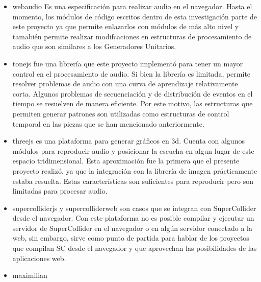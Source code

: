 \begin{itemize}
  
\item \Gls{webaudio} Es una especificación para realizar audio en el navegador. Hasta el momento, los módulos de código escritos dentro de esta investigación parte de este proyecto ya que permite enlazarlos con módulos de más alto nivel y tamabién permite realizar modifcaciones en estructuras de procesamiento de audio que son similares a los Generadores Unitarios.
\item \Gls{tonejs} fue una librería que este proyecto implementó para tener un mayor control en el procesamiento de audio. Si bien la librería es limitada, permite resolver problemas de audio con una curva de aprendizaje relativamente corta. Algunos problemas de secuenciación y de distribución de eventos en el tiempo se resuelven de manera eficiente. Por este motivo, las estructuras que permiten generar patrones son utilizadas como estructuras de control temporal en las piezas que se han mencionado anteriormente.
\item \Gls{threejs} es una plataforma para generar gráficos en 3d. Cuenta con algunos módulos para reproducir audio y posicionar la escucha en algun lugar de este espacio tridimensional. Esta aproximación fue la primera que el presente proyecto realizó, ya que la integración con la librería de imagen prácticamente estaba resuelta. Estas características son suficientes para reproducir pero son limitadas para procesar audio. 
\item \Gls{supercolliderjs} y \Gls{supercolliderweb} son casos que se integran con SuperCollider desde el navegador. Con este plataforma no es posible compilar y ejecutar un servidor de SuperCollider en el navegador o en algún servidor conectado a la web, sin embargo, sirve como punto de partida para hablar de los proyectos que compilan SC desde el navegador y que aprovechan las posibilidades de las aplicaciones web.

\item maximilian 
  
\end{itemize}



